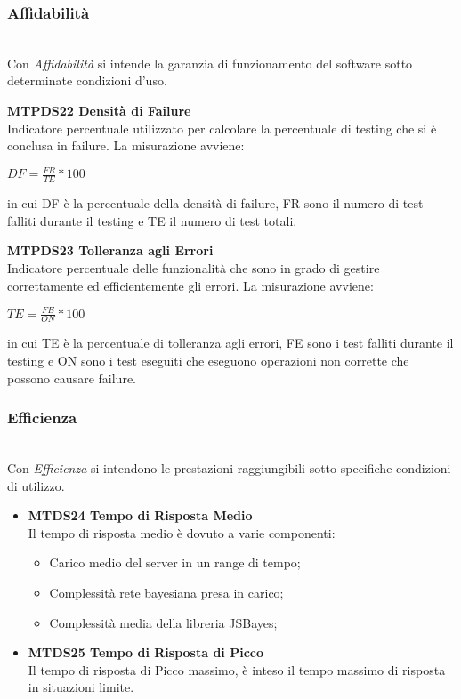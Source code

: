 \subsubsection{Affidabilità}\-\\
Con \textit{Affidabilità} si intende la garanzia di funzionamento del software sotto determinate condizioni d'uso.
\begin{itemize}
	\item \textbf{MTPDS22 Densità di Failure} \-\\
	Indicatore percentuale utilizzato per calcolare la percentuale di testing che si è conclusa in failure. La misurazione avviene: 
	\begin{center}
		\item $ DF = \frac{FR}{TE}*100 $
	\end{center}
	in cui DF è la percentuale della densità di failure, FR sono il numero di test falliti durante il testing e TE il numero di test totali. 
	\item \textbf{MTPDS23 Tolleranza agli Errori} \-\\
	Indicatore percentuale delle funzionalità che sono in grado di gestire correttamente ed efficientemente gli errori. La misurazione avviene: 
	\begin{center}
		\item $ TE = \frac{FE}{ON}*100 $
	\end{center}
	in cui TE è la percentuale di tolleranza agli errori, FE sono i test falliti durante il testing e ON sono i test eseguiti che eseguono operazioni non corrette che possono causare failure. 
\end{itemize}

\subsubsection{Efficienza}\-\\
Con \textit{Efficienza} si intendono le prestazioni raggiungibili sotto specifiche condizioni di utilizzo.
\begin{itemize}
	\item \textbf{MTDS24 Tempo di Risposta Medio}\\
		Il tempo di risposta medio è dovuto a varie componenti: 
		\begin{itemize}
			\item Carico medio del server in un range di tempo;
			\item Complessità rete bayesiana presa in carico; 
			\item Complessità media della libreria JSBayes; 
		\end{itemize} 
	\item \textbf{MTDS25 Tempo di Risposta di Picco}\\
		Il tempo di risposta di Picco massimo, è inteso il tempo massimo di risposta in situazioni limite.
\end{itemize}


